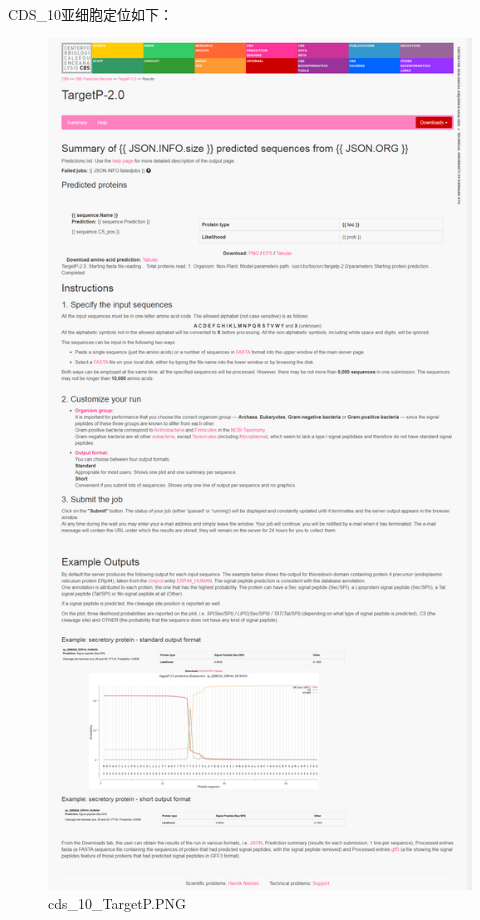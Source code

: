 \documentclass[supercite]{HustGraduPaper}
\begin{document}
	\paragraph{}\label{subpara:subpara}CDS\_10亚细胞定位如下：
	\begin{figure}[H]
		\centering
		\includegraphics[width=1\textwidth]{./material/practice2/cds_10/TargetP.png}
		\caption{cds\_10\_TargetP.PNG}
	\end{figure}
\end{document}
